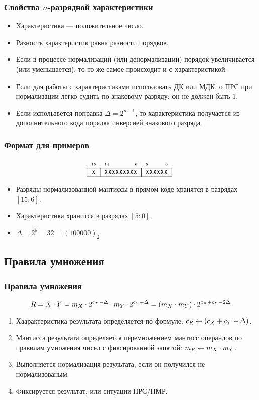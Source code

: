 \begin{frame}
    \frametitle{Свойства $n$-разрядной характеристики}

    \begin{itemize}
        \item Характеристика --- положительное число.
        \item Разность характеристик равна разности порядков.
        \item Если в процессе нормализации (или денормализации) порядок увеличивается (или уменьшается), то то же самое происходит и с характеристикой.
        \item Если для работы с характеристиками использовать ДК или МДК, о ПРС при нормализации легко судить по знаковому разряду: он не должен быть 1.
        \item Если использвется поправка $\Delta=2^{n-1}$, то характеристика получается из дополнительного кода порядка инверсией знакового разряда.
    \end{itemize}
\end{frame}

\begin{frame}
    \frametitle{Формат для примеров}

    \[
        \FloatMyCharHex{X}{XXXXXXXXX}{XXXXXX}
    \]
    \begin{itemize}
        \item Разряды нормализованной мантиссы в прямом коде хранятся в разрядах $[15:6]$.
        \item Характеристика хранится в разрядах $[5:0]$.
        \item $\Delta=2^5=32=(100000)_2$
    \end{itemize}
\end{frame}


\subsection{Правила умножения}


\begin{frame}
    \frametitle{Правила умножения}

    \[
        R=X\cdot Y=
            m_{X}\cdot 2^{c_{X}-\Delta}\cdot
            m_{Y}\cdot 2^{c_{Y}-\Delta}=
            (m_{X}\cdot m_{Y})\cdot 2^{c_{X} + c_{Y}-2\Delta}
    \]
        
    \begin{enumerate}
        \item Хаарактеристика результата определяется по формуле: $c_{R}\gets(c_{X}+c_{Y}-\Delta)$.  
        \item Мантисса результата определяется перемножением мантисс операндов по правилам умножения чисел с фиксированной запятой: $m_{R}\gets m_{X}\cdot m_{Y}$.
        \item Выполняется нормализация результата, если он получился не нормализованым.
        \item Фиксируется результат, или ситуации ПРС/ПМР.
    \end{enumerate}
\end{frame}


